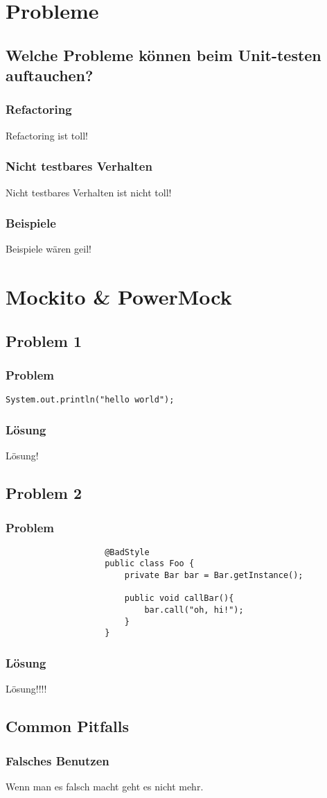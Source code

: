 \documentclass{beamer}
\begin{document}
	\section{Probleme}

		\subsection{Welche Probleme können beim Unit-testen auftauchen?}
		
			\begin{frame}
				\frametitle{Refactoring}
				Refactoring ist toll!
			\end{frame}

			\begin{frame}
				\frametitle{Nicht testbares Verhalten}
				Nicht testbares Verhalten ist nicht toll!
			\end{frame}

			\begin{frame}
				\frametitle{Beispiele}
				Beispiele wären geil!
			\end{frame}

	
	\section{Mockito \& PowerMock}


		\subsection{Problem 1}

			\begin{frame}
				\frametitle{Problem}
				\lstinline|System.out.println("hello world");|
			\end{frame}

			\begin{frame}
				\frametitle{Lösung}
				Lösung!
			\end{frame}


		\subsection{Problem 2}

			\begin{frame}[fragile]
				\frametitle{Problem}

				\begin{lstlisting}
					@BadStyle
					public class Foo {
						private Bar bar = Bar.getInstance();

						public void callBar(){
							bar.call("oh, hi!");
						}
					}
				\end{lstlisting}

			\end{frame}

			\begin{frame}
				\frametitle{Lösung}
				Lösung!!!!
			\end{frame}

		\subsection{Common Pitfalls}

			\begin{frame}
				\frametitle{Falsches Benutzen}
				Wenn man es falsch macht geht es nicht mehr.
			\end{frame}
\end{document}
